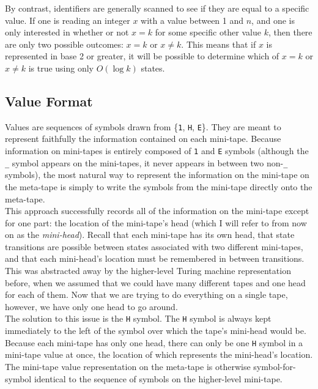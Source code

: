 By contrast, identifiers are generally scanned to see if they are equal to a specific value. If one is reading an integer $x$ with a value between 1 and $n$, and one is only interested in whether or not $x = k$ for some specific other value $k$, then there are only two possible outcomes: $x = k$ or $x \not= k$. This means that if $x$ is represented in base 2 or greater, it will be possible to determine which of $x = k$ or $x \not= k$ is true using only $O(\log k)$ states. \\

\subsection{Value Format}

Values are sequences of symbols drawn from \{\texttt{1}, \texttt{H}, \texttt{E}\}. They are meant to represent faithfully the information contained on each mini-tape. Because information on mini-tapes is entirely composed of \texttt{1} and \texttt{E} symbols (although the \texttt{\_} symbol appears on the mini-tapes, it never appears in between two non-\texttt{\_} symbols), the most natural way to represent the information on the mini-tape on the meta-tape is simply to write the symbols from the mini-tape directly onto the meta-tape. \\

This approach successfully records all of the information on the mini-tape except for one part: the location of the mini-tape's head (which I will refer to from now on as the \emph{mini-head}). Recall that each mini-tape has its own head, that state transitions are possible between states associated with two different mini-tapes, and that each mini-head's location must be remembered in between transitions. This was abstracted away by the higher-level Turing machine representation before, when we assumed that we could have many different tapes and one head for each of them. Now that we are trying to do everything on a single tape, however, we have only one head to go around. \\

The solution to this issue is the \texttt{H} symbol. The \texttt{H} symbol is always kept immediately to the left of the symbol over which the tape's mini-head would be. Because each mini-tape has only one head, there can only be one \texttt{H} symbol in a mini-tape value at once, the location of which represents the mini-head's location. The mini-tape value representation on the meta-tape is otherwise symbol-for-symbol identical to the sequence of symbols on the higher-level mini-tape.

